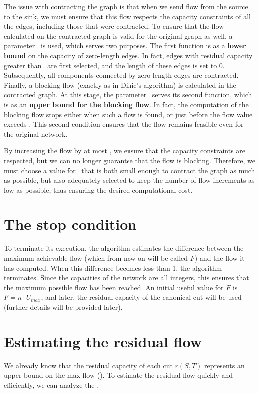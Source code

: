     The issue with contracting the graph is that when we send flow from the source to the sink, we must ensure that this flow respects the capacity constraints of all the edges, including those that were contracted.  
    To ensure that the flow calculated on the contracted graph is valid for the original graph as well, a parameter \dlt\ is used, which serves two purposes. The first function is as a \textbf{lower bound} on the capacity of zero-length edges.  
    In fact, edges with residual capacity greater than \dlt\ are first selected, and the length of these edges is set to 0.  
    Subsequently, all components connected by zero-length edges are contracted.  
    Finally, a blocking flow (exactly as in Dinic's algorithm) is calculated in the contracted graph.  
    At this stage, the parameter \dlt\ serves its second function, which is as an \textbf{upper bound for the blocking flow}. In fact, the computation of the blocking flow stops either when such a flow is found, or just before the flow value exceeds \dlt. This second condition ensures that the flow remains feasible even for the original network.

    By increasing the flow by at most \dlt, we ensure that the capacity constraints are respected, but we can no longer guarantee that the flow is blocking.  
    Therefore, we must choose a value for \dlt\ that is both small enough to contract the graph as much as possible, but also adequately selected to keep the number of flow increments as low as possible, thus ensuring the desired computational cost.

\section{The stop condition}
    To terminate its execution, the algorithm estimates the difference between the maximum achievable flow (which from now on will be called $F$) and the flow it has computed.
    When this difference becomes less than 1, the algorithm terminates.
    Since the capacities of the network are all integers, this ensures that the maximum possible flow has been reached.
    An initial useful value for $F$ is $F=n\cdot U_{max}$, and later, the residual capacity of the canonical cut will be used (further details will be provided later).


\section{Estimating the residual flow}
    We already know that the residual capacity of each cut $r(S,T)$ represents an upper bound on the max flow ().
    To estimate the residual flow quickly and efficiently, we can analyze the .

